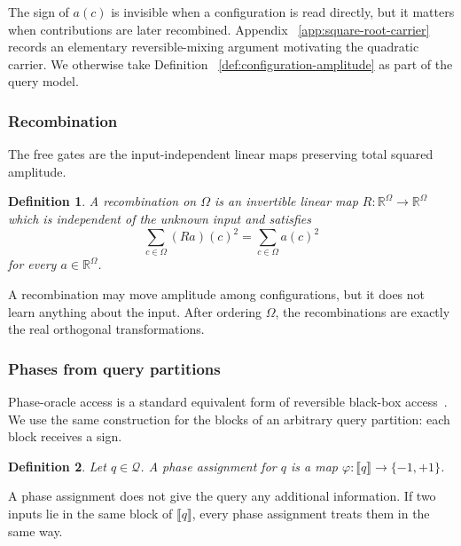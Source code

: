 \documentclass[11pt]{article}
\numberwithin{equation}{section}
\newtheorem{definition}{Definition}[section]
\theoremstyle{remark}
\begin{document}
The sign of $a(c)$ is invisible when a configuration is read directly, but it
matters when contributions are later recombined. Appendix
~\ref{app:square-root-carrier} records an elementary reversible-mixing
argument motivating the quadratic carrier. We otherwise take Definition
~\ref{def:configuration-amplitude} as part of the query model.

\subsubsection{Recombination}
\label{subsec:recombination}

The free gates are the input-independent linear maps preserving total squared
amplitude.

\begin{definition}
\label{def:recombination}
A \emph{recombination} on $\Omega$ is an invertible linear map
\(
    R:\mathbb R^\Omega\longrightarrow\mathbb R^\Omega
\)
which is independent of the unknown input and satisfies
\begin{equation}
    \sum_{c\in\Omega}(Ra)(c)^2
    =
    \sum_{c\in\Omega}a(c)^2
\end{equation}
for every $a\in\mathbb R^\Omega$.
\end{definition}

A recombination may move amplitude among configurations, but it does not
learn anything about the input. After ordering $\Omega$, the recombinations
are exactly the real orthogonal transformations.

\subsubsection{Phases from query partitions}
\label{subsec:phase-queries}

Phase-oracle access is a standard equivalent form of reversible black-box
access~\cite{BealsBuhrmanCleveMoscaDeWolf2001}. We use the same construction
for the blocks of an arbitrary query partition: each block receives a sign.

\begin{definition}
\label{def:phase-assignment}
Let $q\in\mathcal Q$. A \emph{phase assignment} for $q$ is a map
$\varphi:\llbracket q\rrbracket\to\{-1,+1\}$.
\end{definition}

A phase assignment does not give the query any additional information. If
two inputs lie in the same block of $\llbracket q\rrbracket$, every phase
assignment treats them in the same way.
\end{document}
